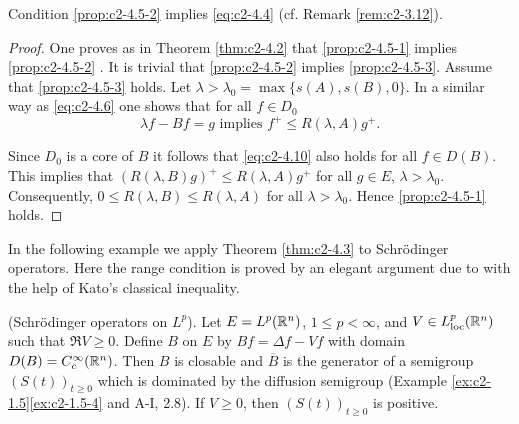 \begin{remark}\label{rem:c2-4.6}
Condition \ref{prop:c2-4.5-2}   implies \eqref{eq:c2-4.4} (cf. Remark \ref{rem:c2-3.12}).
\end{remark}
\begin{proof}
One proves as in Theorem \ref{thm:c2-4.2}   that \ref{prop:c2-4.5-1} implies \ref{prop:c2-4.5-2}  .
It is trivial that \ref{prop:c2-4.5-2}   implies \ref{prop:c2-4.5-3}. 
Assume that \ref{prop:c2-4.5-3}   holds. 
Let $\lambda > \lambda_{0} = \max \{s(A),s(B),0\}$. 
In a similar way as \eqref{eq:c2-4.6} one shows that for all $f \in D_{0}$
\begin{equation}\label{eq:c2-4.10}
\lambda f - Bf = g \text{ implies } f^{+} \leq R(\lambda,A)g^{+}.
\end{equation}

Since $D_{0}$ is a core of $B$ it follows that \eqref{eq:c2-4.10} also holds for all $f \in D(B)$. 
This implies that $(R(\lambda,B)g)^{+} \leq R(\lambda,A)g^{+}$ for all $g \in E$, $\lambda > \lambda_{0}$. 
Consequently, $0 \leq R(\lambda,B) \leq R(\lambda,A)$ for all $\lambda > \lambda_{0}$. 
Hence \ref{prop:c2-4.5-1}   holds.
\end{proof}

In the following example we apply Theorem \ref{thm:c2-4.3} to Schrödinger operators. 
Here the range condition is proved by an elegant argument due to \citet{kato:1986} with the help of Kato's classical inequality.

\begin{example}\label{ex:c2-4.7}
(Schrödinger operators on $L^{p}$).
Let $E = L^{p}(\mathbb{R}^{n})$, $1 \leq p < \infty$, and $V \in L^{p}_{\text{loc}}(\mathbb{R}^{n})$ such that $\Re V \geq 0$.
Define $B$ on $E$ by $Bf = \Delta f - Vf$ with domain $D(B) = C^{\infty}_{c}(\mathbb{R}^{n})$. 
Then $B$ is closable and $\overline{B}$ is the generator of a semigroup $(S(t))_{t \geq 0}$ which is dominated by the diffusion semigroup (Example \ref{ex:c2-1.5}\ref{ex:c2-1.5-4} and A-I, 2.8). 
If $V \geq 0$, then $(S(t))_{t \geq 0}$ is positive.
\end{example}

